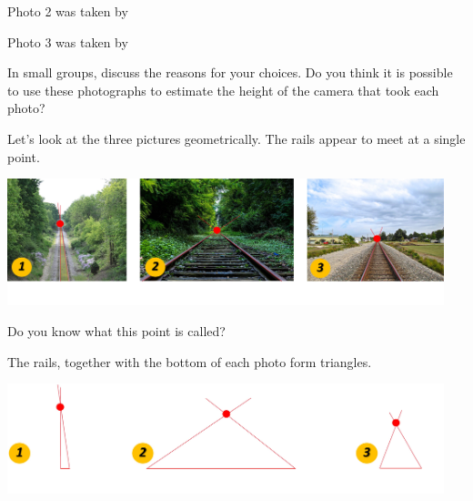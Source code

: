 \documentclass{ximera}
\begin{document}
\begin{exploration}
Photo 2 was taken by 
\begin{multipleChoice}
\end{multipleChoice}

Photo 3 was taken by 
\begin{multipleChoice}
\end{multipleChoice}

In small groups, discuss the reasons for your choices.  Do you think it is possible to use these photographs to estimate the height of the camera that took each photo?
\end{exploration}

\begin{exploration}\label{exp:trianglesAtBase}
    Let's look at the three pictures geometrically.  The rails appear to meet at a single point.  
    
\begin{image}
         \includegraphics[width=5in]{vanishingPoint.jpg}
\end{image}
    
    Do you know what this point is called?
    \begin{multipleChoice}
    \end{multipleChoice}

The rails, together with the bottom of each photo form triangles.  

\begin{image}
         \includegraphics[width=5in]{triangles.jpg}
\end{image}


\end{exploration}
\end{document}
